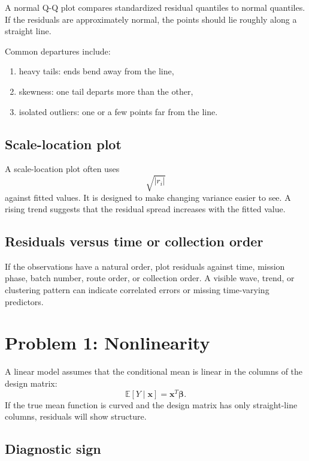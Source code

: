 A normal Q-Q plot compares standardized residual quantiles to normal quantiles.  If the residuals are approximately normal, the points should lie roughly along a straight line.

Common departures include:
\begin{enumerate}
  \item heavy tails: ends bend away from the line,
  \item skewness: one tail departs more than the other,
  \item isolated outliers: one or a few points far from the line.
\end{enumerate}

\subsection{Scale-location plot}

A scale-location plot often uses
\begin{equation}
  \sqrt{|r_i|}
\end{equation}
against fitted values.  It is designed to make changing variance easier to see.  A rising trend suggests that the residual spread increases with the fitted value.

\subsection{Residuals versus time or collection order}

If the observations have a natural order, plot residuals against time, mission phase, batch number, route order, or collection order.  A visible wave, trend, or clustering pattern can indicate correlated errors or missing time-varying predictors.

\section{Problem 1: Nonlinearity}

A linear model assumes that the conditional mean is linear in the columns of the design matrix:
\begin{equation}
  \mathbb{E}[Y\mid \mathbf{x}]=\mathbf{x}^T\boldsymbol{\beta}.
\end{equation}
If the true mean function is curved and the design matrix has only straight-line columns, residuals will show structure.

\subsection*{Diagnostic sign}

